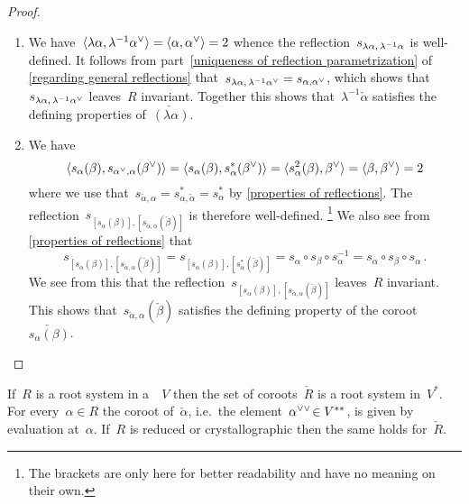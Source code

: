 \begin{proof}
  \leavevmode
  \begin{enumerate}
    \item
      We have~$\pair{\lambda \alpha, \lambda^{-1} \check{\alpha}} = \pair{\alpha, \check{\alpha}} = 2$ whence the reflection~$s_{\lambda \alpha, \, \lambda^{-1} \alpha}$ is well-defined.
      It follows from part~\ref*{uniqueness of reflection parametrization} of \cref{regarding general reflections} that~$s_{\lambda \alpha, \spacing \lambda^{-1} \check{\alpha}} = s_{\alpha, \check{\alpha}}$, which shows that~$s_{\lambda \alpha, \spacing \lambda^{-1} \check{\alpha}}$ leaves~$R$ invariant.
      Together this shows that~$\lambda^{-1} \check{\alpha}$ satisfies the defining properties of~$\check{(\lambda \alpha)}$.
    \item
      We have
      \[
        \pair{s_\alpha(\beta), s_{\check{\alpha}, \alpha}(\check{\beta})}
        =
        \pair{s_\alpha(\beta), s_\alpha^*(\check{\beta})}
        =
        \pair{s_\alpha^2(\beta), \check{\beta}}
        =
        \pair{\beta, \check{\beta}}
        =
        2
      \]
      where we use that~$s_{\check{\alpha}, \alpha}= s_{\alpha, \check{\alpha}}^* = s_\alpha^*$ by \cref{properties of reflections}.
      The reflection~$s_{[s_\alpha(\beta)], [s_{\check{\alpha}, \alpha}(\check{\beta})]}$ is therefore well-defined.%
      \footnote{The brackets are only here for better readability and have no meaning on their own.}
      We also see from \cref{properties of reflections} that
      \[
        s_{[s_\alpha(\beta)], [s_{\check{\alpha}, \alpha}(\check{\beta})]}
        =
        s_{[s_\alpha(\beta)], [s_\alpha^*(\check{\beta})]}
        =
        s_\alpha \circ s_\beta \circ s_\alpha^{-1} 
        =
        s_\alpha \circ s_\beta \circ s_\alpha \,.
      \]
      We see from this that the reflection~$s_{[s_\alpha(\beta)], [s_{\check{\alpha}, \alpha}(\check{\beta})]}$ leaves~$R$ invariant.
      This shows that~$s_{\check{\alpha}, \alpha}(\check{\beta})$ satisfies the defining property of the coroot~$\check{s_\alpha(\beta)}$.
    \qedhere
  \end{enumerate}
\end{proof}


\begin{theorem}
  \label{dual root system}
  If~$R$ is a root system in a~{\vectorspace{$\kf$}}~$V$ then the set of coroots~$\check{R}$ is a root system in~$V^*$.
  For every~$\alpha \in R$ the coroot of~$\check{\alpha}$, i.e.\ the element~$\dcheck*{\alpha} \in V^{**}$, is given by evaluation at~$\alpha$.
  If~$R$ is reduced or crystallographic then the same holds for~$\check{R}$.
\end{theorem}


